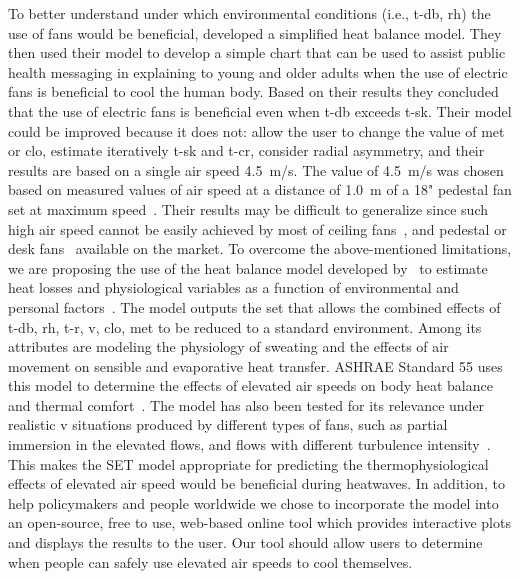 To better understand under which environmental conditions (i.e., \ac{t-db}, \ac{rh}) the use of fans would be beneficial,  developed a simplified heat balance model.
They then used their model to develop a simple chart that can be used to assist public health messaging in explaining to young and older adults when the use of electric fans is beneficial to cool the human body.
Based on their results they concluded that the use of electric fans is beneficial even when \ac{t-db} exceeds \ac{t-sk}.
Their model could be improved because it does not: allow the user to change the value of \ac{met} or \ac{clo}, estimate iteratively \ac{t-sk} and \ac{t-cr}, consider radial asymmetry, and their results are based on a single air speed 4.5~m/s.
The value of 4.5~m/s was chosen based on measured values of air speed at a distance of 1.0~m of a 18" pedestal fan set at maximum speed~\cite{Jay2015}.
Their results may be difficult to generalize since such high air speed cannot be easily achieved by most of ceiling fans~\cite{Raftery2019}, and pedestal or desk fans~\cite{Yang2015a} available on the market.
To overcome the above-mentioned limitations, we are proposing the use of the heat balance model developed by~ to estimate heat losses and physiological variables as a function of environmental and personal factors~\cite{Gagge1986}.
The model outputs the \ac{set} that allows the combined effects of \ac{t-db}, \ac{rh}, \ac{t-r}, \ac{v}, \ac{clo}, \ac{met} to be reduced to a standard environment.
Among its attributes are modeling the physiology of sweating and the effects of air movement on sensible and evaporative heat transfer.
ASHRAE Standard 55 uses this model to determine the effects of elevated air speeds on body heat balance and thermal comfort~\cite{ashrae552017}.
The model has also been tested for its relevance under realistic \ac{v} situations produced by different types of fans, such as partial immersion in the elevated flows, and flows with different turbulence intensity~\cite{Huang2014}.
This makes the SET model appropriate for predicting the thermophysiological effects of elevated air speed would be beneficial during heatwaves.
In addition, to help policymakers and people worldwide we chose to incorporate the model into an open-source, free to use, web-based online tool which provides interactive plots and displays the results to the user.
Our tool should allow users to determine when people can safely use elevated air speeds to cool themselves.